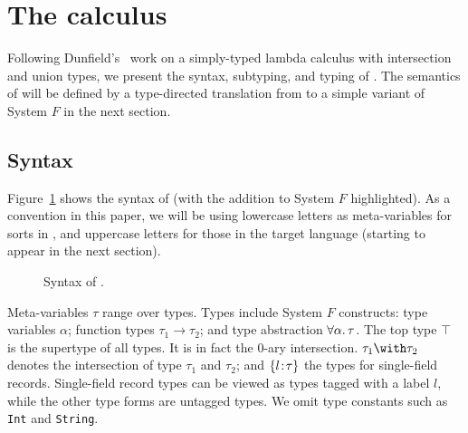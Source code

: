 \section{The \name calculus} \label{sec:fi}


Following Dunfield's~\cite{dunfield2014elaborating} work on a simply-typed
lambda calculus with intersection and union types, we present the syntax,
subtyping, and typing of \name. The semantics of \name will
be defined by a type-directed translation from \name to a simple variant of
System $F$ in the next section.

\subsection{Syntax}

Figure~\ref{fig:fi-syntax} shows the syntax of \name (with the addition to
System $F$ highlighted). As a convention in this paper, we will be using
lowercase letters as meta-variables for sorts in \name, and uppercase letters
for those in the target language (starting to appear in the next section).


\begin{figure}[h]
  
  \caption{Syntax of \name.}
  \label{fig:fi-syntax}
\end{figure}

Meta-variables $\tau$ range over types. Types include System $F$ constructs:
type variables $\alpha$; function types $\tau_1 \to \tau_2$; and type
abstraction $ \forall \alpha. \, \tau $. The top type $\top$ is the supertype of all
types. It is in fact the $0$-ary intersection. $\tau_1 \andop \tau_2$ denotes
the intersection of type $\tau_1$ and $\tau_2$; and $\{ l \!:\! \tau \}$ the types
for single-field records. Single-field record types can be viewed as types
tagged with a label $l$, while the other type forms are untagged types. We omit
type constants such as \lstinline$Int$ and \lstinline$String$.


